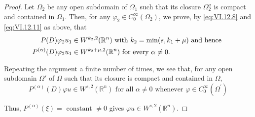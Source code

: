 \begin{proof}
Let $\Omega_{2}$ be any open subdomain of $\Omega_{1}$ such that its closure $\Omega_{2}^{a}$ is compact and contained in $\Omega_{1}$. Then, for any $\varphi_{2} \in C_{0}^{\infty}(\Omega_{2})$, we prove, by \eqref{eq:VI.12.8} and \eqref{eq:VI.12.11} as above, that 
\begin{align}
P (D) \varphi_{2} u _{1}& \in W ^ {k _{2}, 2} (\mathbb{R}^{n}) \text{ with } k _{2} = \min (s, k _{1} + \mu) \text{ and hence } \notag \\
P ^{(\alpha)} (D) \varphi_{2} u _{1}& \in W ^ {k _{2} + \mu , 2} (\mathbb{R}^{n}) \text{ for every } \alpha \neq 0. \notag
\end{align}

Repeating the argument a finite number of times, we see that, for any open subdomain $\Omega'$ of $\Omega$ such that its closure is compact and contained in $\Omega$, 
\[
P ^{(\alpha)} (D) \varphi u \in W ^{s,2} (\mathbb{R}^{n}) \text{ for all } \alpha \neq 0 \text{ whenever } \varphi \in C _{0} ^{\infty} (\Omega^{\prime})
\]

Thus, $P^{(\alpha)}(\xi) = \text{ constant } \neq 0$ gives $\varphi u \in W^{s,2}(\mathbb{R}^{n})$. 
\end{proof}

